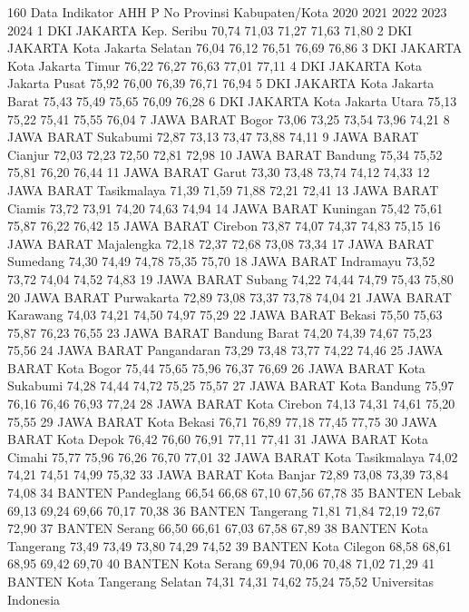 160
Data Indikator AHH P
No Provinsi Kabupaten/Kota 2020 2021 2022 2023 2024
1 DKI JAKARTA Kep. Seribu 70,74 71,03 71,27 71,63 71,80
2 DKI JAKARTA Kota Jakarta Selatan 76,04 76,12 76,51 76,69 76,86
3 DKI JAKARTA Kota Jakarta Timur 76,22 76,27 76,63 77,01 77,11
4 DKI JAKARTA Kota Jakarta Pusat 75,92 76,00 76,39 76,71 76,94
5 DKI JAKARTA Kota Jakarta Barat 75,43 75,49 75,65 76,09 76,28
6 DKI JAKARTA Kota Jakarta Utara 75,13 75,22 75,41 75,55 76,04
7 JAWA BARAT Bogor 73,06 73,25 73,54 73,96 74,21
8 JAWA BARAT Sukabumi 72,87 73,13 73,47 73,88 74,11
9 JAWA BARAT Cianjur 72,03 72,23 72,50 72,81 72,98
10 JAWA BARAT Bandung 75,34 75,52 75,81 76,20 76,44
11 JAWA BARAT Garut 73,30 73,48 73,74 74,12 74,33
12 JAWA BARAT Tasikmalaya 71,39 71,59 71,88 72,21 72,41
13 JAWA BARAT Ciamis 73,72 73,91 74,20 74,63 74,94
14 JAWA BARAT Kuningan 75,42 75,61 75,87 76,22 76,42
15 JAWA BARAT Cirebon 73,87 74,07 74,37 74,83 75,15
16 JAWA BARAT Majalengka 72,18 72,37 72,68 73,08 73,34
17 JAWA BARAT Sumedang 74,30 74,49 74,78 75,35 75,70
18 JAWA BARAT Indramayu 73,52 73,72 74,04 74,52 74,83
19 JAWA BARAT Subang 74,22 74,44 74,79 75,43 75,80
20 JAWA BARAT Purwakarta 72,89 73,08 73,37 73,78 74,04
21 JAWA BARAT Karawang 74,03 74,21 74,50 74,97 75,29
22 JAWA BARAT Bekasi 75,50 75,63 75,87 76,23 76,55
23 JAWA BARAT Bandung Barat 74,20 74,39 74,67 75,23 75,56
24 JAWA BARAT Pangandaran 73,29 73,48 73,77 74,22 74,46
25 JAWA BARAT Kota Bogor 75,44 75,65 75,96 76,37 76,69
26 JAWA BARAT Kota Sukabumi 74,28 74,44 74,72 75,25 75,57
27 JAWA BARAT Kota Bandung 75,97 76,16 76,46 76,93 77,24
28 JAWA BARAT Kota Cirebon 74,13 74,31 74,61 75,20 75,55
29 JAWA BARAT Kota Bekasi 76,71 76,89 77,18 77,45 77,75
30 JAWA BARAT Kota Depok 76,42 76,60 76,91 77,11 77,41
31 JAWA BARAT Kota Cimahi 75,77 75,96 76,26 76,70 77,01
32 JAWA BARAT Kota Tasikmalaya 74,02 74,21 74,51 74,99 75,32
33 JAWA BARAT Kota Banjar 72,89 73,08 73,39 73,84 74,08
34 BANTEN Pandeglang 66,54 66,68 67,10 67,56 67,78
35 BANTEN Lebak 69,13 69,24 69,66 70,17 70,38
36 BANTEN Tangerang 71,81 71,84 72,19 72,67 72,90
37 BANTEN Serang 66,50 66,61 67,03 67,58 67,89
38 BANTEN Kota Tangerang 73,49 73,49 73,80 74,29 74,52
39 BANTEN Kota Cilegon 68,58 68,61 68,95 69,42 69,70
40 BANTEN Kota Serang 69,94 70,06 70,48 71,02 71,29
41 BANTEN Kota Tangerang Selatan 74,31 74,31 74,62 75,24 75,52
Universitas Indonesia

